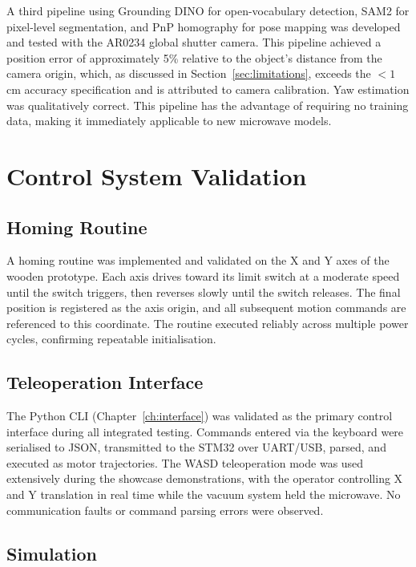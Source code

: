 A third pipeline using Grounding DINO for open-vocabulary detection, SAM2 for pixel-level segmentation, and PnP homography for pose mapping was developed and tested with the AR0234 global shutter camera. This pipeline achieved a position error of approximately 5\% relative to the object's distance from the camera origin, which, as discussed in Section~\ref{sec:limitations}, exceeds the $<1$\,cm accuracy specification and is attributed to camera calibration. Yaw estimation was qualitatively correct. This pipeline has the advantage of requiring no training data, making it immediately applicable to new microwave models.


\section{Control System Validation}

\subsection{Homing Routine}

A homing routine was implemented and validated on the X and Y axes of the wooden prototype. Each axis drives toward its limit switch at a moderate speed until the switch triggers, then reverses slowly until the switch releases. The final position is registered as the axis origin, and all subsequent motion commands are referenced to this coordinate. The routine executed reliably across multiple power cycles, confirming repeatable initialisation.

\subsection{Teleoperation Interface}

The Python CLI (Chapter~\ref{ch:interface}) was validated as the primary control interface during all integrated testing. Commands entered via the keyboard were serialised to JSON, transmitted to the STM32 over UART/USB, parsed, and executed as motor trajectories. The WASD teleoperation mode was used extensively during the showcase demonstrations, with the operator controlling X and Y translation in real time while the vacuum system held the microwave. No communication faults or command parsing errors were observed.

\subsection{Simulation}

